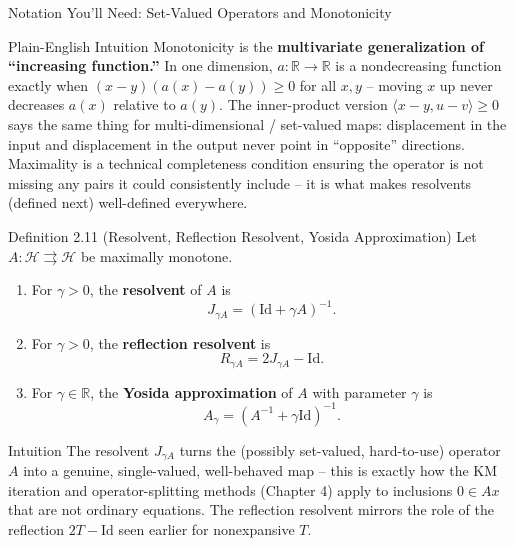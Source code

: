 \documentclass[aspectratio=169,10pt]{beamer}
\newcommand{\Id}{\mathrm{Id}}
\newcommand{\R}{\mathbb{R}}
\begin{document}
\begin{frame}[allowframebreaks]{Notation You'll Need: Set-Valued Operators and Monotonicity}
  \begin{block}{Plain-English Intuition}
    Monotonicity is the \textbf{multivariate generalization of ``increasing
    function.''} In one dimension, $a: \R \to \R$ is a nondecreasing function
    exactly when $(x-y)(a(x)-a(y)) \ge 0$ for all $x,y$ -- moving $x$ up
    never decreases $a(x)$ relative to $a(y)$. The inner-product version
    $\langle x-y, u-v\rangle \ge 0$ says the same thing for
    multi-dimensional / set-valued maps: displacement in the input and
    displacement in the output never point in ``opposite'' directions.
    Maximality is a technical completeness condition ensuring the operator
    is not missing any pairs it could consistently include -- it is what
    makes resolvents (defined next) well-defined everywhere.
  \end{block}

  \framebreak

  \begin{block}{Definition 2.11 (Resolvent, Reflection Resolvent, Yosida Approximation)}
    Let $A : \mathcal{H} \rightrightarrows \mathcal{H}$ be maximally monotone.
    \begin{enumerate}
      \item[(1)] For $\gamma > 0$, the \textbf{resolvent} of $A$ is
        \[
          J_{\gamma A} = (\Id + \gamma A)^{-1}. \tag{2.5}
        \]
      \item[(2)] For $\gamma > 0$, the \textbf{reflection resolvent} is
        \[
          R_{\gamma A} = 2 J_{\gamma A} - \Id. \tag{2.6}
        \]
      \item[(3)] For $\gamma \in \R$, the \textbf{Yosida approximation} of
        $A$ with parameter $\gamma$ is
        \[
          A_\gamma = (A^{-1} + \gamma\Id)^{-1}.
        \]
    \end{enumerate}
  \end{block}

  \begin{block}{Intuition}
    The resolvent $J_{\gamma A}$ turns the (possibly set-valued, hard-to-use)
    operator $A$ into a genuine, single-valued, well-behaved map -- this is
    exactly how the KM iteration and operator-splitting methods (Chapter 4)
    apply to inclusions $0 \in Ax$ that are not ordinary equations. The
    reflection resolvent mirrors the role of the reflection $2T-\Id$ seen
    earlier for nonexpansive $T$.
  \end{block}

  \framebreak


\end{frame}
\end{document}
